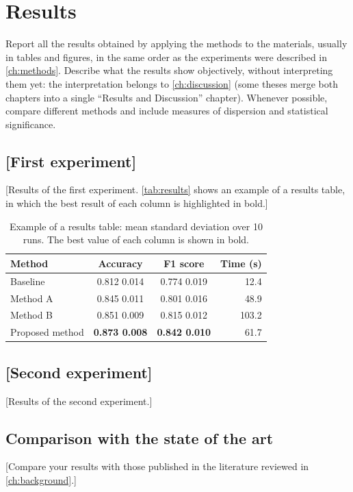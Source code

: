 \chapter{Results}\label{ch:results}

\begin{guidance}
Report all the results obtained by applying the methods to the materials, usually in
tables and figures, in the same order as the experiments were described in
\autoref{ch:methods}. Describe what the results show objectively, without interpreting them
yet: the interpretation belongs to \autoref{ch:discussion} (some theses merge both chapters
into a single \enquote{Results and Discussion} chapter). Whenever possible, compare
different methods and include measures of dispersion and statistical significance.
\end{guidance}

\section{[First experiment]}\label{sec:experiment-1}

[Results of the first experiment. \autoref{tab:results} shows an example of a results table, in
which the best result of each column is highlighted in bold.]

\begin{table}[htbp]
  \centering
  \caption{Example of a results table: mean \textpm{} standard deviation over 10 runs. The
  best value of each column is shown in bold.}
  \label{tab:results}
  \begin{tabular}{@{}l c c r@{}}
    \toprule
    \textbf{Method} & \textbf{Accuracy} & \textbf{F1 score} & \textbf{Time (s)} \\
    \midrule
    Baseline        & 0.812 \textpm{} 0.014 & 0.774 \textpm{} 0.019 & 12.4 \\
    Method A        & 0.845 \textpm{} 0.011 & 0.801 \textpm{} 0.016 & 48.9 \\
    Method B        & 0.851 \textpm{} 0.009 & 0.815 \textpm{} 0.012 & 103.2 \\
    Proposed method & \textbf{0.873 \textpm{} 0.008} & \textbf{0.842 \textpm{} 0.010} & 61.7 \\
    \bottomrule
  \end{tabular}
\end{table}

\section{[Second experiment]}\label{sec:experiment-2}

[Results of the second experiment.]

\section{Comparison with the state of the art}\label{sec:comparison}

[Compare your results with those published in the literature reviewed in
\autoref{ch:background}.]
